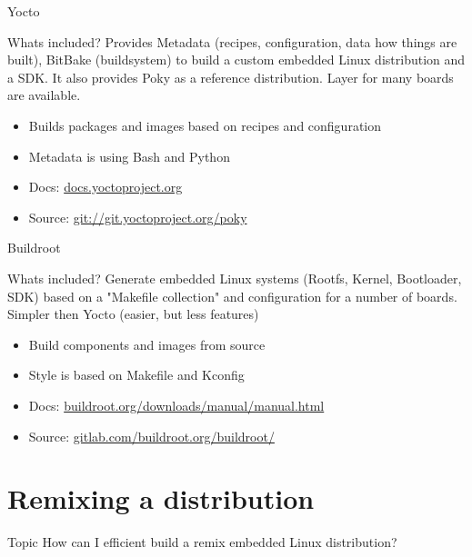 \documentclass{beamer}
\begin{document}
\begin{frame}{Yocto}
	\begin{block}{Whats included?}
		Provides Metadata (recipes, configuration, data how things are built), BitBake (buildsystem) to build a custom embedded Linux distribution and a SDK. It also provides Poky as a reference distribution. Layer for many boards are available.
	\end{block}

	\begin{itemize}
		\item Builds packages and images based on recipes and configuration
		\item Metadata is using Bash and Python
		\item Docs: \href{https://docs.yoctoproject.org/}{docs.yoctoproject.org}
		\item Source: \url{git://git.yoctoproject.org/poky}
	\end{itemize}
\end{frame}

\begin{frame}{Buildroot}
	\begin{block}{Whats included?}
		Generate embedded Linux systems (Rootfs, Kernel, Bootloader, SDK)  based on a "Makefile collection" and configuration for a number of boards. Simpler then Yocto (easier, but less features)
	\end{block}

	\begin{itemize}
		\item Build components and images from source
		\item Style is based on Makefile and Kconfig 
		\item Docs: \href{https://buildroot.org/downloads/manual/manual.html}{buildroot.org/downloads/manual/manual.html}
		\item Source: \href{https://gitlab.com/buildroot.org/buildroot/}{gitlab.com/buildroot.org/buildroot/}
	\end{itemize}
\end{frame}

\section{Remixing a distribution}

\begin{frame}
	\begin{block}{Topic}
		How can I efficient build a remix embedded Linux distribution?
	\end{block}
\end{frame}
\end{document}
